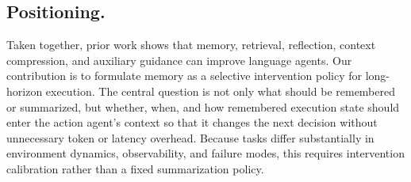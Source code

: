 \subsection{Positioning.}
Taken together, prior work shows that memory, retrieval, reflection, context compression, and auxiliary guidance can improve language agents. Our contribution is to formulate memory as a selective intervention policy for long-horizon execution. The central question is not only what should be remembered or summarized, but whether, when, and how remembered execution state should enter the action agent's context so that it changes the next decision without unnecessary token or latency overhead. Because tasks differ substantially in environment dynamics, observability, and failure modes, this requires intervention calibration rather than a fixed summarization policy.
